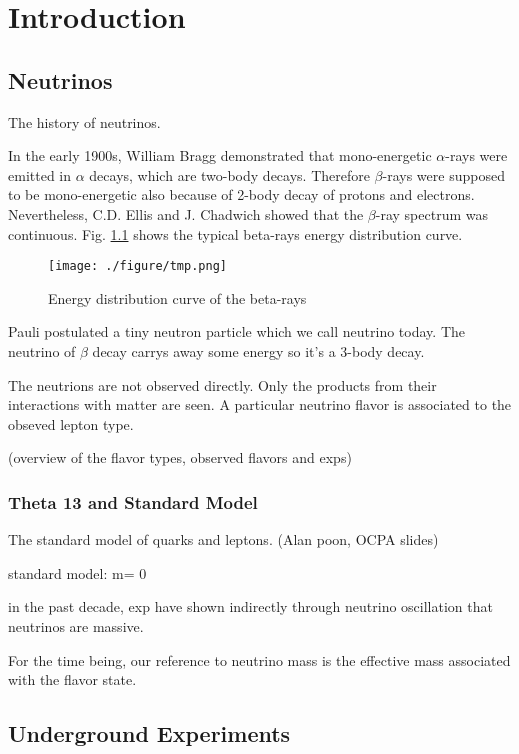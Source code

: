 
\chapter{Introduction}

\section{Neutrinos}

The history of neutrinos.

In the early 1900s, William Bragg demonstrated that mono-energetic $\alpha$-rays
were emitted in $\alpha$ decays, which are two-body decays. Therefore $\beta$-rays
were supposed to be mono-energetic also because of 2-body decay of protons and
electrons. Nevertheless, C.D. Ellis and J. Chadwich showed that the $\beta$-ray
spectrum was continuous. Fig. \ref{fig:tmp} shows the typical beta-rays energy distribution curve.


\begin{figure}
    \centering
    \texttt{[image: ./figure/tmp.png]}
    \caption{Energy distribution curve of the beta-rays\cite{Scott:1935}}
    \label{fig:tmp}
    \end{figure}


Pauli postulated a tiny neutron particle which we call neutrino today. The neutrino
of $\beta$ decay carrys away some energy so it's a 3-body decay.

The neutrions are not observed directly. Only the products from their interactions
with matter are seen. A particular neutrino flavor is associated to the obseved lepton type.


(overview of the flavor types, observed flavors and exps)




\subsection{Theta 13 and Standard Model}

The standard model of quarks and leptons. (Alan poon, OCPA slides)


standard model: m= 0

in the past decade, exp have shown indirectly through neutrino oscillation 
that neutrinos are massive.

For the time being, our reference to neutrino mass is the effective mass
associated with the flavor state.

\section{Underground Experiments}

